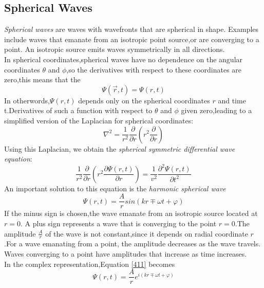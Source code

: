 \documentclass[12pt]{article}
\numberwithin{equation}{section}
\begin{document}
\subsection{Spherical Waves}
\emph{Spherical waves} are waves with wavefronts that are spherical in shape. Examples include waves that emanate from an isotropic point source,or are converging to a point.
An isotropic source emits waves symmetrically in all directions.\\
\indent In spherical coordinates,spherical waves have no dependence on the angular coordinates $\theta$ and $\phi$,so the derivatives with respect to these coordinates are zero,this means that the
\[
    \Psi(\vec{r},t)=\Psi(r,t)
\]
In otherwords,$\Psi(r,t)$ depends only on the spherical coordinates $r$ and time t.Derivatives of such a function with respect to $\theta$ and $\phi$ given zero,leading to a simplified version of the Laplacian for spherical coordinates:
\begin{equation}
    \nabla^2=\frac{1}{r^2}\frac{\partial}{\partial{r}}(r^2\frac{\partial}{\partial{r}})\label{49}
\end{equation}
Using this Laplacian, we obtain the \emph{spherical symmetric differential wave equation}:
\begin{equation}
    \frac{1}{r^2}\frac{\partial}{\partial{r}}(r^2\frac{\partial{\Psi(r,t)}}{\partial{r}})=\frac{1}{v^2}\frac{\partial^2{\Psi(r,t)}}{\partial{t^2}}\label{410}
\end{equation}
An important solution to this equation is the \emph{harmonic spherical wave}
\begin{equation}
    \Psi(r,t)=\frac{A}{r}sin(kr \mp \omega t+\varphi)\label{411}
\end{equation}
If the minus sign is chosen,the wave emanate from an isotropic source located at $r=0$.
A plus sign represents a wave that is converging to the point $r=0$.The amplitude $\frac{A}{r}$ of 
the wave is not constant,since it depends on radial coordinate $r$.For a wave emanating from a point,
the amplitude decreases as the wave travels. Waves converging to a point have amplitudes that increase as time increases.\\
\indent  In the complex representation,Equation \eqref{411} becomes
\begin{equation}
    \Psi(r,t)=\frac{A}{r}e^{i(kr \mp \omega t+\varphi)}
\end{equation}
\newpage
\appendix
\end{document}
